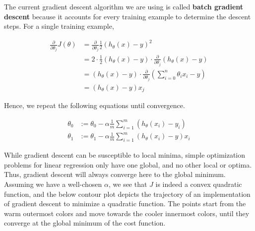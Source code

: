 \documentclass{article}
\begin{document}
        \noindent The current gradient descent algorithm we are using is called \textbf{batch gradient descent}
        because it accounts for every training example to determine the descent steps. For a single training
        example,

        \begin{align*}
            \frac{\partial}{\partial\theta_j}J(\theta)  &= \frac{\partial}{\partial\theta_j}\frac{1}{2}(h_\theta(x)-y)^2 \\
                                                        &= 2\cdot\frac{1}{2}(h_\theta(x)-y)\cdot
                                                           \frac{\partial}{\partial\theta_j}(h_\theta(x)-y) \\
                                                        &= (h_\theta(x)-y)\cdot\frac{\partial}{\partial\theta_j}
                                                           \left(\sum^n_{i=0}\theta_i x_i-y\right) \\
                                                        &= (h_\theta(x)-y)x_j
        \end{align*}

        \noindent Hence, we repeat the following equations until convergence.

        \begin{align*}
            \theta_0 &:= \theta_0-\alpha\frac{1}{m}\sum^m_{i=1}(h_\theta(x_i)-y_i) \\
            \theta_1 &:= \theta_1-\alpha\frac{1}{m}\sum^m_{i=1}(h_\theta(x_i)-y)x_i
        \end{align*}

        \noindent While gradient descent can be susceptible to local minima, simple optimization problems for
        linear regression only have one global, and no other local or optima. Thus, gradient descent will always
        converge here to the global minimum. Assuming we have a well-chosen $\alpha$, we see that $J$ is indeed
        a convex quadratic function, and the below contour plot depicts the trajectory of an implementation of
        gradient descent to minimize a quadratic function. The points start from the warm outermost colors and
        move towards the cooler innermost colors, until they converge at the global minimum of the cost function.
\end{document}
